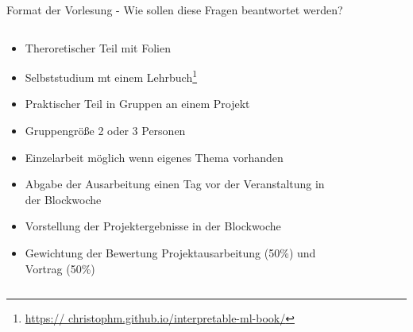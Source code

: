\documentclass[aspectratio=1610, xcolor=dvipsnames, 9pt]{beamer}
\begin{document}
\begin{frame}{Format der Vorlesung - Wie sollen diese Fragen beantwortet werden?}
  \begin{columns}
    \begin{column}{0.69\textwidth}
      \begin{itemize}
        \item Theroretischer Teil mit Folien \newline
        \item Selbststudium mt einem Lehrbuch\footnote{\url{https:// christophm.github.io/interpretable-ml-book/}} \newline
        \item Praktischer Teil in Gruppen an einem Projekt  \newline
        \item Gruppengröße 2 oder 3 Personen  \newline
        \item Einzelarbeit möglich wenn eigenes Thema vorhanden \newline
        \item Abgabe der Ausarbeitung einen Tag vor der Veranstaltung in der Blockwoche \newline
        \item Vorstellung der Projektergebnisse in der Blockwoche \newline
        \item Gewichtung der Bewertung Projektausarbeitung (50\%) und Vortrag (50\%)
      \end{itemize}
    \end{column}
    \begin{column}{0.3\textwidth}
 \begin{figure}
 \centering

\end{figure}
\end{column}
\end{columns}
\end{frame}
\end{document}

